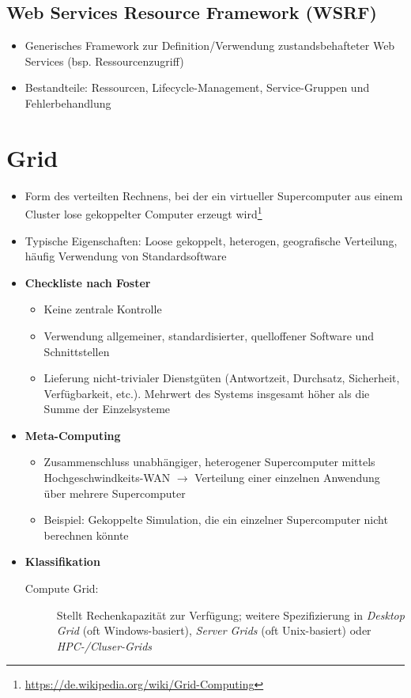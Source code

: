 \subsection{Web Services Resource Framework (WSRF)}
\begin{itemize}
	\item Generisches Framework zur Definition/Verwendung zustandsbehafteter Web Services (bsp. Ressourcenzugriff)
	\item Bestandteile: Ressourcen, Lifecycle-Management, Service-Gruppen und Fehlerbehandlung
\end{itemize}



\section{Grid}
\begin{itemize}
	\item Form des verteilten Rechnens, bei der ein virtueller Supercomputer aus einem Cluster lose gekoppelter Computer erzeugt wird\footnote{\url{https://de.wikipedia.org/wiki/Grid-Computing}}
	\item Typische Eigenschaften: Loose gekoppelt, heterogen, geografische Verteilung, häufig Verwendung von Standardsoftware
	\item \textbf{Checkliste nach Foster}
	\begin{itemize}
		\item Keine zentrale Kontrolle
		\item Verwendung allgemeiner, standardisierter, quelloffener Software und Schnittstellen
		\item Lieferung nicht-trivialer Dienstgüten (Antwortzeit, Durchsatz, Sicherheit, Verfügbarkeit, etc.). Mehrwert des Systems insgesamt höher als die Summe der Einzelsysteme 
	\end{itemize}
	\item \textbf{Meta-Computing}
	\begin{itemize}
		\item Zusammenschluss unabhängiger, heterogener Supercomputer mittels Hochgeschwindkeits-WAN \(\rightarrow\) Verteilung einer einzelnen Anwendung über mehrere Supercomputer
		\item Beispiel: Gekoppelte Simulation, die ein einzelner Supercomputer nicht berechnen könnte
	\end{itemize}
	\item \textbf{Klassifikation}
	\begin{description}
		\item[Compute Grid:] Stellt Rechenkapazität zur Verfügung; weitere Spezifizierung in \textit{Desktop Grid} (oft Windows-basiert), \textit{Server Grids} (oft Unix-basiert) oder \textit{HPC-/Cluser-Grids}

\end{description}
\end{itemize}
